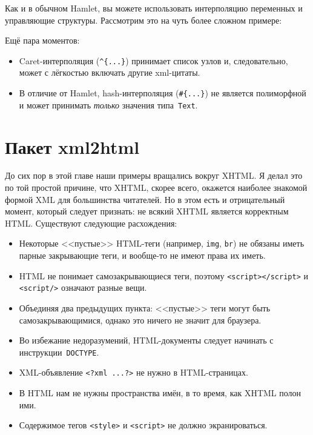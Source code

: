 Как и в обычном Hamlet, вы можете использовать интерполяцию переменных и
управляющие структуры. Рассмотрим это на чуть более сложном примере:


Ещё пара моментов:
\begin{itemize}
    \item Caret-интерполяция (\verb'^{...}') принимает список узлов и,
        следовательно, может с лёгкостью включать другие xml-цитаты.

    \item В отличие от Hamlet, hash-интерполяция (\verb'#{...}') не является
        полиморфной и может принимать \emph{только} значения
        типа~\lstinline!Text!.
\end{itemize}

\section{Пакет xml2html}
До сих пор в этой главе наши примеры вращались вокруг XHTML. Я делал это по той
простой причине, что XHTML, скорее всего, окажется наиболее знакомой формой XML
для большинства читателей. Но в этом есть и отрицательный момент, который
следует признать: не всякий XHTML является корректным HTML. Существуют
следующие расхождения:
\begin{itemize}
    \item Некоторые <<пустые>> HTML-теги (например, \lstinline!img!,
        \lstinline!br!) не обязаны иметь парные закрывающие теги, и вообще-то
        не имеют права их иметь.

    \item HTML не понимает самозакрывающиеся теги, поэтому
        \lstinline!<script></script>! и \lstinline!<script/>! означают разные
        вещи.

    \item Объединяя два предыдущих пункта: <<пустые>> теги могут быть
        самозакрывающимися, однако это ничего не значит для браузера.

    \item Во избежание недоразумений, HTML-документы следует начинать с
        инструкции~\lstinline!DOCTYPE!.

    \item XML-объявление \lstinline!<?xml ...?>! не нужно в HTML-страницах.

    \item В HTML нам не нужны пространства имён, в то время, как XHTML полон
        ими.

    \item Содержимое тегов \lstinline!<style>! и \lstinline!<script>! не должно
        экранироваться. %

\end{itemize}

